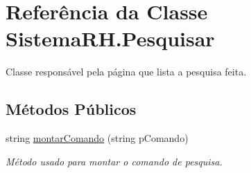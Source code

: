 \hypertarget{class_sistema_r_h_1_1_pesquisar}{
\section{Referência da Classe SistemaRH.Pesquisar}
\label{class_sistema_r_h_1_1_pesquisar}
}


Classe responsável pela página que lista a pesquisa feita.  


\subsection*{Métodos Públicos}
\begin{DoxyCompactItemize}
\item 
string \hyperlink{class_sistema_r_h_1_1_pesquisar_ae21e33af51baae9a5b23ab37e1eb6715}{montarComando} (string pComando)
\begin{DoxyCompactList}\small\item\em Método usado para montar o comando de pesquisa. \item\end{DoxyCompactList}\end{DoxyCompactItemize}
